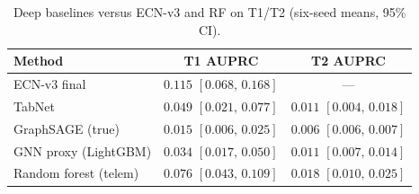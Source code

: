 \begin{table}[!t]
\centering
\caption{Deep baselines versus ECN-v3 and RF on T1/T2 (six-seed means, 95\% CI).}
\label{tab:deep_baselines_v5}
\renewcommand{\arraystretch}{1.1}
{\footnotesize\begin{tabular*}{\columnwidth}{@{\extracolsep{\fill}}lcc}
\toprule
Method & T1 AUPRC & T2 AUPRC \\
\midrule
ECN-v3 final & $0.115$ $[0.068,\,0.168]$ & --- \\
TabNet & $0.049$ $[0.021,\,0.077]$ & $0.011$ $[0.004,\,0.018]$ \\
GraphSAGE (true) & $0.015$ $[0.006,\,0.025]$ & $0.006$ $[0.006,\,0.007]$ \\
GNN proxy (LightGBM) & $0.034$ $[0.017,\,0.050]$ & $0.011$ $[0.007,\,0.014]$ \\
Random forest (telem) & $0.076$ $[0.043,\,0.109]$ & $0.018$ $[0.010,\,0.025]$ \\
\bottomrule
\end{tabular*}}
\end{table}

